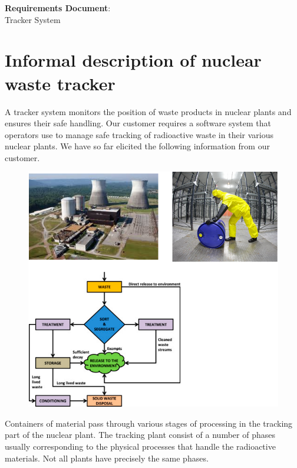 \newpage

\vspace*{2in}
\begin{center}
\huge{\textbf{Requirements Document}:\\ Tracker System}
\end{center}

\newpage
\newpage
\tableofcontents
\listoffigures
\listoftables
\newpage

\section{Informal description of nuclear waste tracker}
A tracker system monitors the position of waste products in nuclear plants and ensures their safe handling. Our customer requires a software system that operators use to manage safe tracking of radioactive waste in their various nuclear plants. We have so far elicited the following information from our customer. 

\begin{figure}[hbt]
\begin{center}
  \includegraphics[width=.7\textwidth]{images/waste.pdf}
\end{center}
\end{figure}

Containers of material pass through various stages of processing in the tracking part of the nuclear plant. The tracking plant consist of a number of phases usually corresponding to the physical processes that handle the radioactive materials. Not all plants have precisely the same phases.

